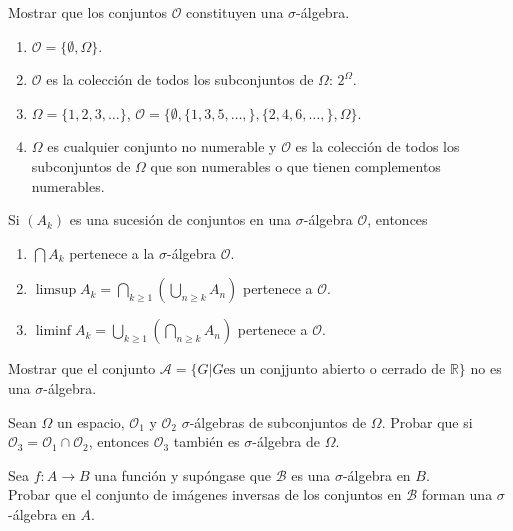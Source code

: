 \documentclass{book}
\begin{document}
\begin{ejer}{} 
Mostrar que los conjuntos $ \mathscr{O}$ constituyen una $\sigma$-\'algebra.
\begin{enumerate}
\item $\mathscr{O}=\{\emptyset, \Omega\}$.
\item $\mathscr{O}$ es la colecci\'on de todos los subconjuntos de $\Omega$: $2^{\Omega}$.
\item $\Omega=\{1,2,3,\dots\}$, $\mathscr{O}=\{\emptyset,\{1,3,5,\dots,\},\{2,4,6,\dots,\},\Omega\}$.
\item $\Omega$ es cualquier conjunto no numerable y $\mathscr{O}$ es la colecci\'on de todos los subconjuntos
de $\Omega$ que son numerables o que tienen complementos numerables.
\end{enumerate}
\end{ejer} 


\begin{ejer}{} 
Si $(A_k)$ es una sucesi\'on de conjuntos en una $\sigma$-\'algebra $\mathscr{O}$, entonces
\begin{enumerate}
\item $\bigcap A_k$ pertenece a la $\sigma$-\'algebra $\mathscr{O}$.
\item $\limsup A_k=\bigcap\limits_{k\geq 1}\left(\bigcup\limits_{n\geq k} A_n\right)$ pertenece a $\mathscr{O}$.
\item $\liminf A_k=\bigcup\limits_{k\geq 1}\left(\bigcap\limits_{n\geq k} A_n\right)$ pertenece a $\mathscr{O}$.
 \end{enumerate}
 \end{ejer}  

\begin{ejer}{} 
Mostrar que el conjunto $\mathscr{A}=\{G| G \text{es un conjjunto abierto o cerrado de } \mathbb{R}\}$ no es una $\sigma$-álgebra. 
\end{ejer} 

\begin{ejer}{} 
Sean $\Omega$ un espacio, $\mathscr{O}_1$ y  $\mathscr{O}_2$ $\sigma$-\'algebras de subconjuntos de 
$\Omega$. Probar que si $\mathscr{O}_3=\mathscr{O}_1\cap \mathscr{O}_2$, entonces $\mathscr{O}_3$ 
tambi\'en es $\sigma$-\'algebra de $\Omega$. 
\end{ejer} 


\begin{ejer}{} 
Sea $f: A\to B$ una funci\'on  y sup\'ongase que $\mathscr{B}$ es una $\sigma$-\'algebra en $B$. \\
Probar que el conjunto de im\'agenes inversas de los conjuntos en $\mathscr{B}$  forman una 
$\sigma$-\'algebra en $A$. 
\end{ejer}
 
\end{document}
